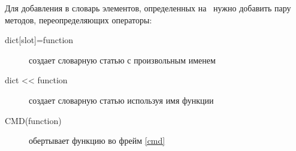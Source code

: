 \label{fdict}


\noindent
Для добавления в словарь элементов, определенных на \py\ нужно добавить пару
методов, переопределяющих операторы:
\begin{description}
\item[{dict[slot]=function}] создает словарную статью с произвольным именем
\item[dict << function] создает словарную статью используя имя функции
\item[CMD(function)] обертывает функцию во фрейм \ref{cmd}
\end{description}

\medskip
{}
